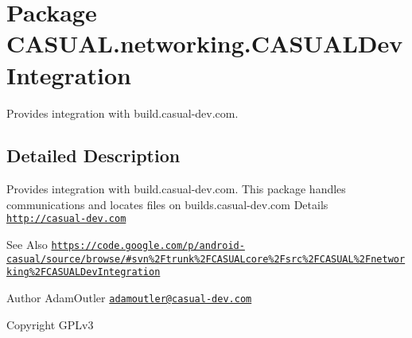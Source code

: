 \hypertarget{namespaceCASUAL_1_1networking_1_1CASUALDevIntegration}{\section{Package C\-A\-S\-U\-A\-L.\-networking.\-C\-A\-S\-U\-A\-L\-Dev\-Integration}
\label{namespaceCASUAL_1_1networking_1_1CASUALDevIntegration}
}


Provides integration with build.\-casual-\/dev.\-com.  




\subsection{Detailed Description}
Provides integration with build.\-casual-\/dev.\-com. This package handles communications and locates files on builds.\-casual-\/dev.\-com Details \href{http://casual-dev.com}{\tt http\-://casual-\/dev.\-com} \begin{DoxySeeAlso}{See Also}
\href{https://code.google.com/p/android-casual/source/browse/#svn%2Ftrunk%2FCASUALcore%2Fsrc%2FCASUAL%2Fnetworking%2FCASUALDevIntegration}{\tt https\-://code.\-google.\-com/p/android-\/casual/source/browse/\#svn\%2\-Ftrunk\%2\-F\-C\-A\-S\-U\-A\-Lcore\%2\-Fsrc\%2\-F\-C\-A\-S\-U\-A\-L\%2\-Fnetworking\%2\-F\-C\-A\-S\-U\-A\-L\-Dev\-Integration} 
\end{DoxySeeAlso}
\begin{DoxyAuthor}{Author}
Adam\-Outler \href{mailto:adamoutler@casual-dev.com}{\tt adamoutler@casual-\/dev.\-com} 
\end{DoxyAuthor}
\begin{DoxyCopyright}{Copyright}
G\-P\-Lv3 
\end{DoxyCopyright}
